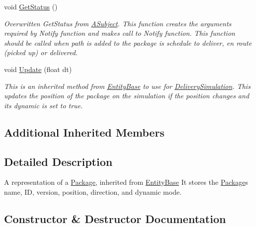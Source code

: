 \begin{DoxyCompactItemize}
\mbox{\label{classcsci3081_1_1Package_aaf2a9604fc4d3dd108e4b4002751be05}} 
void \hyperlink{classcsci3081_1_1Package_aaf2a9604fc4d3dd108e4b4002751be05}{Get\+Status} ()
\begin{DoxyCompactList}\small\item\em Overwritten Get\+Status from \hyperlink{classcsci3081_1_1ASubject}{A\+Subject}. This function creates the arguments required by Notify function and makes call to Notify function. This function should be called when path is added to the package is schedule to deliver, en route (picked up) or delivered. \end{DoxyCompactList}\item 
\mbox{\label{classcsci3081_1_1Package_acd1f198a6e087c08e1cfeed0f44a90be}} 
void \hyperlink{classcsci3081_1_1Package_acd1f198a6e087c08e1cfeed0f44a90be}{Update} (float dt)
\begin{DoxyCompactList}\small\item\em This is an inherited method from \hyperlink{classcsci3081_1_1EntityBase}{Entity\+Base} to use for \hyperlink{classcsci3081_1_1DeliverySimulation}{Delivery\+Simulation}. This updates the position of the package on the simulation if the position changes and its dynamic is set to true. \end{DoxyCompactList}\end{DoxyCompactItemize}
\subsection*{Additional Inherited Members}


\subsection{Detailed Description}
A representation of a \hyperlink{classcsci3081_1_1Package}{Package}, inherited from \hyperlink{classcsci3081_1_1EntityBase}{Entity\+Base} It stores the \hyperlink{classcsci3081_1_1Package}{Package}\textquotesingle{}s name, ID, version, position, direction, and dynamic mode. 

\subsection{Constructor \& Destructor Documentation}
\mbox{\label{classcsci3081_1_1Package_abf7f7782bd24ceeae85f4ec6e16a8021}} 
